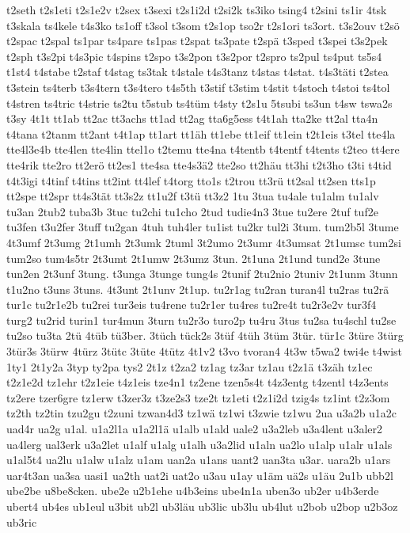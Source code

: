 {t2seth
t2s1eti
t2s1e2v
t2sex
t3sexi
t2s1i2d
t2si2k
ts3iko
tsing4
t2sini
ts1ir
4tsk
t3skala
ts4kele
t4s3ko
ts1off
t3sol
t3som
t2s1op
tso2r
t2s1ori
ts3ort.
t3s2ouv
t2sö
t2spac
t2spal
ts1par
ts4pare
ts1pas
t2spat
ts3pate
t2spä
t3sped
t3spei
t3s2pek
t2sph
t3s2pi
t4s3pic
t4spins
t2spo
t3s2pon
t3s2por
t2spro
ts2pul
ts4put
ts5s4
t1st4
t4stabe
t2staf
t4stag
ts3tak
t4stale
t4s3tanz
t4stas
t4stat.
t4s3täti
t2stea
t3stein
ts4terb
t3s4tern
t3s4tero
t4s5th
t3stif
t3stim
t4stit
t4stoch
t4stoi
ts4tol
t4stren
ts4tric
t4strie
ts2tu
t5stub
ts4tüm
t4sty
t2s1u
5tsubi
ts3un
t4sw
tswa2s
t3sy
4t1t
tt1ab
tt2ac
tt3achs
tt1ad
tt2ag
tta6g5ess
t4t1ah
tta2ke
tt2al
tta4n
t4tana
t2tanm
tt2ant
t4t1ap
tt1art
tt1äh
tt1ebe
tt1eif
tt1ein
t2t1eis
t3tel
tte4la
tte4l3e4b
tte4len
tte4lin
ttel1o
t2temu
tte4na
t4tentb
t4tentf
t4tents
t2teo
tt4ere
tte4rik
tte2ro
tt2erö
tt2es1
tte4sa
tte4s3ä2
tte2so
tt2häu
tt3hi
t2t3ho
t3ti
t4tid
t4t3igi
t4tinf
t4tins
tt2int
tt4lef
t4torg
tto1s
t2trou
tt3rü
tt2sal
tt2sen
tts1p
tt2spe
tt2spr
tt4s3tät
tt3s2z
tt1u2f
t3tü
tt3z2
1tu
3tua
tu4ale
tu1alm
tu1alv
tu3an
2tub2
tuba3b
3tuc
tu2chi
tu1cho
2tud
tudie4n3
3tue
tu2ere
2tuf
tuf2e
tu3fen
t3u2fer
3tuff
tu2gan
4tuh
tuh4ler
tu1ist
tu2kr
tul2i
3tum.
tum2b5l
3tume
4t3umf
2t3umg
2t1umh
2t3umk
2tuml
3t2umo
2t3umr
4t3umsat
2t1umsc
tum2si
tum2so
tum4s5tr
2t3umt
2t1umw
2t3umz
3tun.
2t1una
2t1und
tund2e
3tune
tun2en
2t3unf
3tung.
t3unga
3tunge
tung4s
2tunif
2tu2nio
2tuniv
2t1unm
3tunn
t1u2no
t3uns
3tuns.
4t3unt
2t1unv
2t1up.
tu2r1ag
tu2ran
turan4l
tu2ras
tu2rä
tur1c
tu2r1e2b
tu2rei
tur3eis
tu4rene
tu2r1er
tu4res
tu2re4t
tu2r3e2v
tur3f4
turg2
tu2rid
turin1
tur4mun
3turn
tu2r3o
turo2p
tu4ru
3tus
tu2sa
tu4schl
tu2se
tu2so
tu3ta
2tü
4tüb
tü3ber.
3tüch
tück2s
3tüf
4tüh
3tüm
3tür.
tür1c
3türe
3türg
3tür3s
3türw
4türz
3tütc
3tüte
4tütz
4t1v2
t3vo
tvoran4
4t3w
t5wa2
twi4e
t4wist
1ty1
2t1y2a
3typ
ty2pa
tys2
2t1z
t2za2
tz1ag
tz3ar
tz1au
t2z1ä
t3zäh
tz1ec
t2z1e2d
tz1ehr
t2z1eie
t4z1eis
tze4n1
tz2ene
tzen5s4t
t4z3entg
t4zentl
t4z3ents
tz2ere
tzer6gre
tz1erw
t3zer3z
t3ze2s3
tze2t
tz1eti
t2z1i2d
tzig4s
tz1int
t2z3om
tz2th
tz2tin
tzu2gu
t2zuni
tzwan4d3
tz1wä
tz1wi
t3zwie
tz1wu
2ua
u3a2b
u1a2c
uad4r
ua2g
u1al.
u1a2l1a
u1a2l1ä
u1alb
u1ald
uale2
u3a2leb
u3a4lent
u3aler2
ua4lerg
ual3erk
u3a2let
u1alf
u1alg
u1alh
u3a2lid
u1aln
ua2lo
u1alp
u1alr
u1als
u1al5t4
ua2lu
u1alw
u1alz
u1am
uan2a
u1ans
uant2
uan3ta
u3ar.
uara2b
u1ars
uar4t3an
ua3sa
uasi1
ua2th
uat2i
uat2o
u3au
u1ay
u1äm
uä2s
u1äu
2u1b
ubb2l
ube2be
u8be8cken.
ube2e
u2b1ehe
u4b3eins
ube4n1a
uben3o
ub2er
u4b3erde
ubert4
ub4es
ub1eul
u3bit
ub2l
ub3läu
ub3lic
ub3lu
ub4lut
u2bob
u2bop
u2b3oz
ub3ric
}
